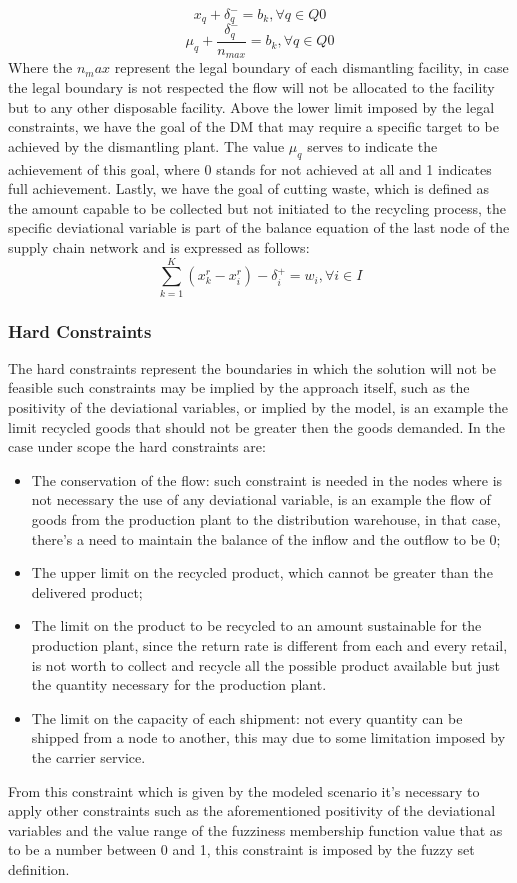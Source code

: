 \begin{doublespace}
 $$
 x_q + \delta^-_q = b_{k},\forall q \in Q0
 $$
 $$
 \mu_q + \frac{\delta^-_q}{n_{max}}= b_{k},\forall q \in Q0
 $$
 Where the $n_max$ represent the legal boundary of each dismantling facility, in case the legal boundary is not respected the flow will not be allocated to the facility but to any other disposable facility. Above the lower limit imposed by the legal constraints, we have the goal of the DM that may require a specific target to be achieved by the dismantling plant. The value $\mu_q$ serves to indicate the achievement of this goal, where 0 stands for not achieved at all and 1 indicates full achievement.
 Lastly, we have the goal of cutting waste, which is defined as the amount capable to be collected but not initiated to the recycling process, the specific deviational variable is part of the balance equation of the last node of the supply chain network and is expressed as follows:
$$
\sum_{k=1}^{K} (x^r_{k} - x^r_{i}) - \delta^+_i= w_i,\forall i \in I
$$

\subsubsection{Hard Constraints}
The hard constraints represent the boundaries in which the solution will not be feasible such constraints may be implied by the approach itself, such as the positivity of the deviational variables, or implied by the model, is an example the limit recycled goods that should not be greater then the goods demanded. In the case under scope the hard constraints are:
\begin{itemize}
\item The conservation of the flow: such constraint is needed in the nodes where is not necessary the use of any deviational variable, is an example the flow of goods from the production plant to the distribution warehouse, in that case, there's a need to maintain the balance of the inflow and the outflow to be 0;
\item The upper limit on the recycled product, which cannot be greater than the delivered product;
\item The limit on the product to be recycled to an amount sustainable for the production plant, since the return rate is different from each and every retail, is not worth to collect and recycle all the possible product available but just the quantity necessary for the production plant.
\item The limit on the capacity of each shipment: not every quantity can be shipped from a node to another, this may due to some limitation imposed by the carrier service.
\end{itemize}
From this constraint which is given by the modeled scenario it's necessary to apply other constraints such as the aforementioned positivity of the deviational variables and the value range of the fuzziness membership function value that as to be a number between 0 and 1, this constraint is imposed by the fuzzy set definition.


\end{doublespace}
